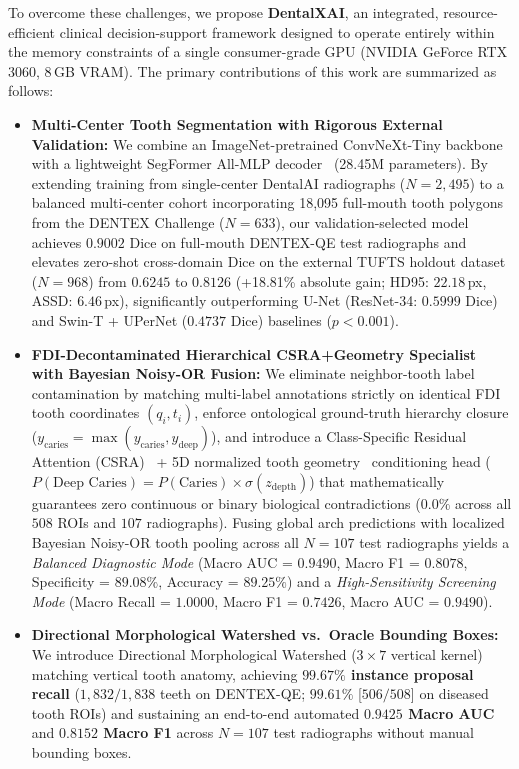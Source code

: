 \documentclass[review]{elsarticle}
\begin{document}
To overcome these challenges, we propose \textbf{DentalXAI}, an integrated, resource-efficient clinical decision-support framework designed to operate entirely within the memory constraints of a single consumer-grade GPU (NVIDIA GeForce RTX 3060, 8\,GB VRAM). The primary contributions of this work are summarized as follows:
\begin{itemize}
    \item \textbf{Multi-Center Tooth Segmentation with Rigorous External Validation:} We combine an ImageNet-pretrained ConvNeXt-Tiny backbone~\cite{liu2022convnext} with a lightweight SegFormer All-MLP decoder~\cite{xie2021segformer} (28.45M parameters). By extending training from single-center DentalAI radiographs ($N=2,495$) to a balanced multi-center cohort incorporating 18,095 full-mouth tooth polygons from the DENTEX Challenge ($N=633$), our validation-selected model achieves $0.9002$ Dice on full-mouth DENTEX-QE test radiographs and elevates zero-shot cross-domain Dice on the external TUFTS holdout dataset ($N=968$) from $0.6245$ to $0.8126$ (+18.81\% absolute gain; HD95: $22.18$\,px, ASSD: $6.46$\,px), significantly outperforming U-Net (ResNet-34: $0.5999$ Dice) and Swin-T + UPerNet ($0.4737$ Dice) baselines ($p < 0.001$).
    \item \textbf{FDI-Decontaminated Hierarchical CSRA+Geometry Specialist with Bayesian Noisy-OR Fusion:} We eliminate neighbor-tooth label contamination by matching multi-label annotations strictly on identical FDI tooth coordinates $(q_i, t_i)$, enforce ontological ground-truth hierarchy closure ($y_{\text{caries}} = \max(y_{\text{caries}}, y_{\text{deep}})$), and introduce a Class-Specific Residual Attention (CSRA)~\cite{zhu2021residual} + 5D normalized tooth geometry~\cite{hamamci2023dentex} conditioning head ($P(\text{Deep Caries}) = P(\text{Caries}) \times \sigma(z_{\text{depth}})$) that mathematically guarantees zero continuous or binary biological contradictions ($0.0\%$ across all $508$ ROIs and $107$ radiographs). Fusing global arch predictions with localized Bayesian Noisy-OR tooth pooling across all $N=107$ test radiographs yields a \emph{Balanced Diagnostic Mode} (Macro AUC = $0.9490$, Macro F1 = $0.8078$, Specificity = $89.08\%$, Accuracy = $89.25\%$) and a \emph{High-Sensitivity Screening Mode} (Macro Recall = $1.0000$, Macro F1 = $0.7426$, Macro AUC = $0.9490$).
    \item \textbf{Directional Morphological Watershed vs.\ Oracle Bounding Boxes:} We introduce Directional Morphological Watershed ($3 \times 7$ vertical kernel) matching vertical tooth anatomy, achieving \textbf{$99.67\%$ instance proposal recall} ($1,832 / 1,838$ teeth on DENTEX-QE; $99.61\%$ [$506/508$] on diseased tooth ROIs) and sustaining an end-to-end automated \textbf{$0.9425$ Macro AUC} and \textbf{$0.8152$ Macro F1} across $N=107$ test radiographs without manual bounding boxes.

\end{itemize}
\end{document}

